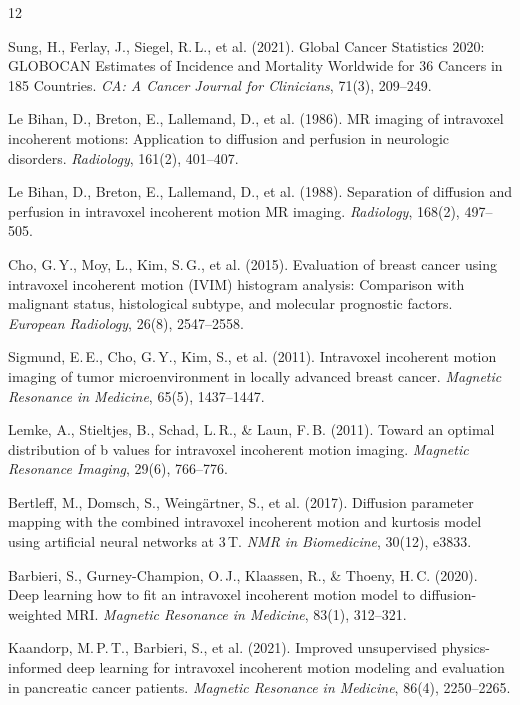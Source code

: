 \documentclass[12pt]{article}
\begin{document}
\begin{thebibliography}{12}

Sung, H., Ferlay, J., Siegel, R.\,L., et al. (2021).
Global Cancer Statistics 2020: GLOBOCAN Estimates of Incidence and Mortality Worldwide for 36 Cancers in 185 Countries.
\textit{CA: A Cancer Journal for Clinicians}, 71(3), 209--249.

Le Bihan, D., Breton, E., Lallemand, D., et al. (1986).
MR imaging of intravoxel incoherent motions: Application to diffusion and perfusion in neurologic disorders.
\textit{Radiology}, 161(2), 401--407.

Le Bihan, D., Breton, E., Lallemand, D., et al. (1988).
Separation of diffusion and perfusion in intravoxel incoherent motion MR imaging.
\textit{Radiology}, 168(2), 497--505.

Cho, G.\,Y., Moy, L., Kim, S.\,G., et al. (2015).
Evaluation of breast cancer using intravoxel incoherent motion (IVIM) histogram analysis: Comparison with malignant status, histological subtype, and molecular prognostic factors.
\textit{European Radiology}, 26(8), 2547--2558.

Sigmund, E.\,E., Cho, G.\,Y., Kim, S., et al. (2011).
Intravoxel incoherent motion imaging of tumor microenvironment in locally advanced breast cancer.
\textit{Magnetic Resonance in Medicine}, 65(5), 1437--1447.

Lemke, A., Stieltjes, B., Schad, L.\,R., \& Laun, F.\,B. (2011).
Toward an optimal distribution of b values for intravoxel incoherent motion imaging.
\textit{Magnetic Resonance Imaging}, 29(6), 766--776.

Bertleff, M., Domsch, S., Weing\"{a}rtner, S., et al. (2017).
Diffusion parameter mapping with the combined intravoxel incoherent motion and kurtosis model using artificial neural networks at 3\,T.
\textit{NMR in Biomedicine}, 30(12), e3833.

Barbieri, S., Gurney-Champion, O.\,J., Klaassen, R., \& Thoeny, H.\,C. (2020).
Deep learning how to fit an intravoxel incoherent motion model to diffusion-weighted MRI.
\textit{Magnetic Resonance in Medicine}, 83(1), 312--321.

Kaandorp, M.\,P.\,T., Barbieri, S., et al. (2021).
Improved unsupervised physics-informed deep learning for intravoxel incoherent motion modeling and evaluation in pancreatic cancer patients.
\textit{Magnetic Resonance in Medicine}, 86(4), 2250--2265.


\end{thebibliography}
\end{document}
